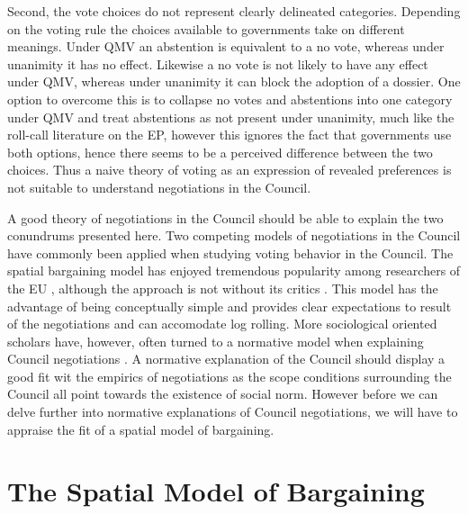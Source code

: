 Second, the vote choices do not represent clearly delineated categories. Depending on the voting rule the choices available to governments take on different meanings. Under QMV an abstention is equivalent to a no vote, whereas under unanimity it has no effect. Likewise a no vote is not likely to have any effect under QMV, whereas under unanimity it can block the adoption of a dossier. One option to overcome this is to collapse no votes and abstentions into one category under QMV and treat abstentions as not present under unanimity, much like the roll-call literature on the EP, however this ignores the fact that governments use both options, hence there seems to be a perceived difference between the two choices. Thus a naive theory of voting as an expression of revealed preferences is not suitable to understand negotiations in the Council. 

A good theory of negotiations in the Council should be able to explain the two conundrums presented here. Two competing models of negotiations in the Council have commonly been applied when studying voting behavior in the Council. The spatial bargaining model has enjoyed tremendous popularity  among researchers of the EU \citep{MattilaLane2001, Warntjen2008}, although the approach is not without its critics \citetext{see \citealt{HorlWarntjenWonka2005} for a good overview}. This model has the advantage of being conceptually simple and provides clear expectations to result of the negotiations and can accomodate log rolling. More sociological oriented scholars have, however, often turned to a normative model when explaining Council negotiations \citep{Lewis2005,Heisenberg2005}. A normative explanation of the Council should display a good fit wit the empirics of negotiations as the scope conditions surrounding the Council all point towards the existence of social norm. However before we can delve further into normative explanations of Council negotiations, we will have to appraise the fit of a spatial model of bargaining. 



\section{The Spatial Model of Bargaining}

